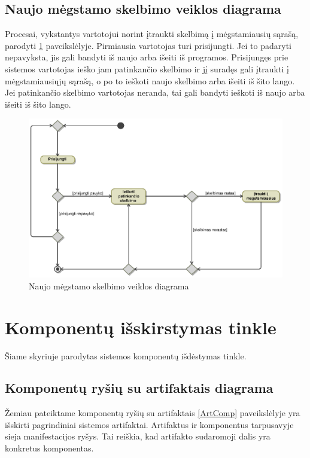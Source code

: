 \documentclass[12pt]{article}
\begin{document}
	\subsection{Naujo mėgstamo skelbimo veiklos diagrama}
	Procesai, vykstantys vartotojui norint įtraukti skelbimą į mėgstamiausių sąrašą, parodyti \ref{FavActivity} paveikslėlyje. Pirmiausia vartotojas turi prisijungti. Jei to padaryti nepavyksta, jis gali bandyti iš naujo arba išeiti iš programos. Prisijungęs prie sistemos vartotojas ieško jam patinkančio skelbimo ir jį suradęs gali įtraukti į mėgstamiausiųjų sąrašą, o po to ieškoti naujo skelbimo arba išeiti iš šito lango. Jei patinkančio skelbimo vartotojas neranda, tai gali bandyti ieškoti iš naujo arba išeiti iš šito lango.
	\begin{figure}[h]
		\begin{center}
			\includegraphics[width=\textwidth]{MegstamiausiuVeikla.eps}
			\caption{Naujo mėgstamo skelbimo veiklos diagrama\label{FavActivity}}
		\end{center}
	\end{figure}
	
	\pagebreak
	
	\section{Komponentų išskirstymas tinkle}
	Šiame skyriuje parodytas sistemos komponentų išdėstymas tinkle.
	\subsection{Komponentų ryšių su artifaktais diagrama}
	
	Žemiau pateiktame komponentų ryšių su artifaktais \ref{ArtComp} paveikslėlyje yra išskirti pagrindiniai sistemos artifaktai. Artifaktus ir komponentus tarpusavyje sieja manifestacijos ryšys. Tai reiškia, kad artifakto sudaromoji dalis yra konkretus komponentas.
	
\end{document}
